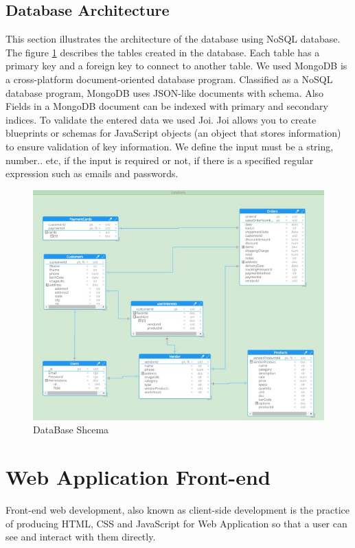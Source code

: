 \subsection{Database Architecture}
\hspace{2cm}This section illustrates the architecture of the database using NoSQL database. The figure \ref{fig: db schema} describes the tables created in the database. Each table has a primary key and a foreign key to connect to another table.
We used MongoDB is a cross-platform document-oriented database program. Classified as a NoSQL database program, MongoDB uses JSON-like documents with schema. Also Fields in a MongoDB document can be indexed with primary and secondary indices.
To validate the entered data we used Joi. Joi allows you to create blueprints or schemas for JavaScript objects (an object that stores information) to ensure validation of key information.
We define the input must be a string, number.. etc, if the input is required or not, if there is a specified regular expression such as emails and passwords.
\begin{figure}[htp]%
    \center%
    \includegraphics[width=1\textwidth]{images/Software/dbSchema.jpeg}%
    \caption[DataBase Shcema]{DataBase Shcema}\label{fig: db schema}%
  \end{figure} \newpage
  

\section{Web Application Front-end}
\hspace{2cm}Front-end web development, also known as client-side development is the practice of producing HTML, CSS and JavaScript for Web Application so that a user can see and interact with them directly. 

